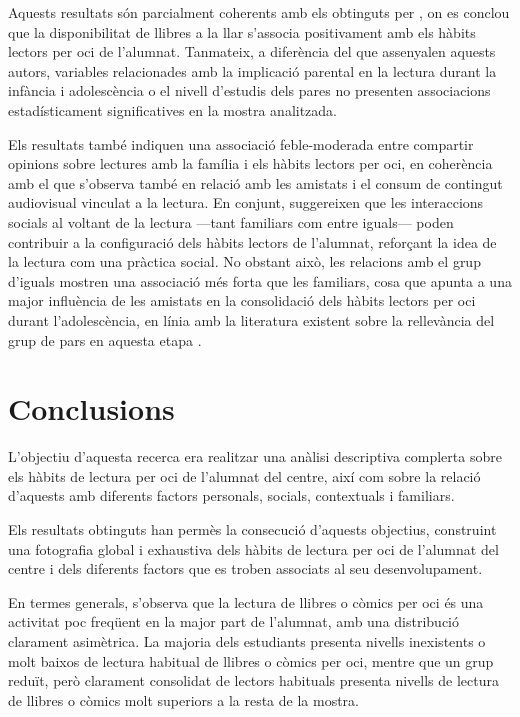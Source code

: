 \documentclass[12pt]{article}
\begin{document}
Aquests resultats són parcialment coherents amb els obtinguts per \textcite{shutaleva}, on es conclou que la disponibilitat de llibres a la llar s'associa positivament amb els hàbits lectors per oci de l'alumnat. Tanmateix, a diferència del que assenyalen aquests autors, variables relacionades amb la implicació parental en la lectura durant la infància i adolescència o el nivell d'estudis dels pares no presenten associacions estadísticament significatives en la mostra analitzada.

Els resultats també indiquen una associació feble-moderada entre compartir opinions sobre lectures amb la família i els hàbits lectors per oci, en coherència amb el que s’observa també en relació amb les amistats i el consum de contingut audiovisual vinculat a la lectura. En conjunt, suggereixen que les interaccions socials al voltant de la lectura ---tant familiars com entre iguals--- poden contribuir a la configuració dels hàbits lectors de l’alumnat, reforçant la idea de la lectura com una pràctica social. No obstant això, les relacions amb el grup d’iguals mostren una associació més forta que les familiars, cosa que apunta a una major influència de les amistats en la consolidació dels hàbits lectors per oci durant l’adolescència, en línia amb la literatura existent sobre la rellevància del grup de pars en aquesta etapa \parencite{arnett}.

\newpage
\section{Conclusions}
L'objectiu d'aquesta recerca era realitzar una anàlisi descriptiva complerta sobre els hàbits de lectura per oci de l'alumnat del centre, així com sobre la relació d'aquests amb diferents factors personals, socials, contextuals i familiars. 

Els resultats obtinguts han permès la consecució d'aquests objectius, construint una fotografia global i exhaustiva dels hàbits de lectura per oci de l'alumnat del centre i dels diferents factors que es troben associats al seu desenvolupament.

En termes generals, s’observa que la lectura de llibres o còmics per oci és una activitat poc freqüent en la major part de l'alumnat, amb una distribució clarament asimètrica. La majoria dels estudiants presenta nivells inexistents o molt baixos de lectura habitual de llibres o còmics per oci, mentre que un grup reduït, però clarament consolidat de lectors habituals presenta nivells de lectura de llibres o còmics molt superiors a la resta de la mostra.
\end{document}
